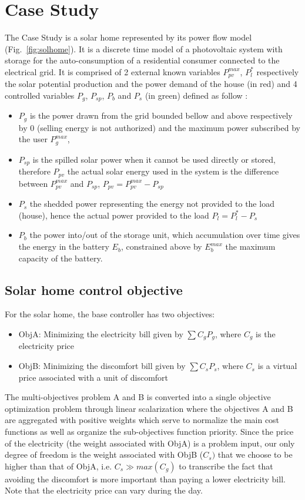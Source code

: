 \documentclass[conference]{IEEEtran}
\begin{document}
\section{Case Study}\label{CaseStudy}

\quad The Case Study is a solar home represented by its power flow model (Fig.~\ref{fig:solhome}). It is a discrete time model of a photovoltaic system with storage for the auto-consumption of a residential consumer connected to the electrical grid. It is comprised of 2 external known variables $P_{pv}^{max}$, $P_l^*$ respectively the solar potential production  and the power demand of the house (in red) and 4 controlled variables $P_g$, $P_{sp}$, $P_b$ and $P_s$ (in green) defined as follow : 
\begin{itemize}
\item $P_g$ is the power drawn from the grid bounded bellow and above
respectively by 0 (selling energy is not authorized) and the maximum power subscribed by the user $P_g^{max}$,
\item $P_{sp}$ is the spilled solar power when it cannot be used directly or stored, therefore $P_{pv}$ the actual solar energy used in the system is the difference between $P_{pv}^{max}$ and $P_{sp}$, $P_{pv} = P_{pv}^{max}-P_{sp}$
\item $P_s$ the shedded power representing the energy not provided to the load (house), hence the actual power provided to the load $P_l = P_l^* - P_s$
\item $P_b$ the power into/out of the storage unit, which accumulation over time gives the energy in the battery $E_b$, constrained above by $E_b^{max}$ the maximum capacity of the battery. 
\end{itemize}
\subsection{Solar home control objective }

For the solar home, the base controller has two objectives:
\begin{itemize}
    \item ObjA: Minimizing the electricity bill given by $\sum C_gP_g$, where $C_g$ is the electricity price
    \item ObjB: Minimizing the  discomfort bill given by $\sum C_sP_s$, where $C_s$ is a virtual price associated with a unit of discomfort
\end{itemize}
The multi-objectives problem A and B is converted into a single objective optimization problem through linear scalarization \cite{Deb2014} where the objectives A and B are aggregated with positive weights which serve to normalize the main cost functions as well as organize the sub-objectives function
priority. Since the price of the electricity (the weight associated with ObjA) is a problem input, our only degree of freedom is the weight associated with ObjB ($C_s)$ that we choose to be higher than that of ObjA, i.e. $C_s \gg max(C_g)$ to transcribe the fact that avoiding the discomfort is more important than paying a lower electricity bill. Note that the electricity price can vary during the day.
\end{document}
